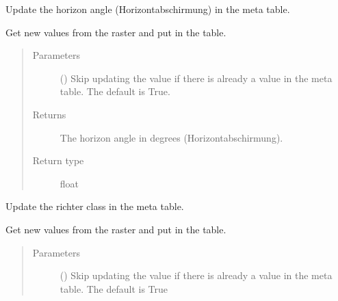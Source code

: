 \documentclass[letterpaper,10pt,english]{sphinxmanual}
\begin{document}
\begin{fulllineitems}
\begin{fulllineitems}
\end{fulllineitems}


\begin{fulllineitems}
\label{\detokenize{weatherDB:weatherDB.station.PrecipitationStation.update_horizon}}
\sphinxAtStartPar
Update the horizon angle (Horizontabschirmung) in the meta table.

\sphinxAtStartPar
Get new values from the raster and put in the table.
\begin{quote}\begin{description}
\item[{Parameters}] \leavevmode
\sphinxAtStartPar
{} (\sphinxstyleliteralemphasis{\sphinxupquote{, }}) \textendash{} Skip updating the value if there is already a value in the meta table.
The default is True.

\item[{Returns}] \leavevmode
\sphinxAtStartPar
The horizon angle in degrees (Horizontabschirmung).

\item[{Return type}] \leavevmode
\sphinxAtStartPar
float

\end{description}\end{quote}

\end{fulllineitems}


\begin{fulllineitems}
\label{\detokenize{weatherDB:weatherDB.station.PrecipitationStation.update_richter_class}}
\sphinxAtStartPar
Update the richter class in the meta table.

\sphinxAtStartPar
Get new values from the raster and put in the table.
\begin{quote}\begin{description}
\item[{Parameters}] \leavevmode
\sphinxAtStartPar
{} (\sphinxstyleliteralemphasis{\sphinxupquote{, }}) \textendash{} Skip updating the value if there is already a value in the meta table.
The default is True


\end{description}
\end{quote}
\end{fulllineitems}
\end{fulllineitems}
\end{document}
